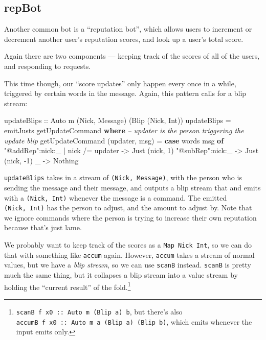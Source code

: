 \documentclass[]{article}
\newenvironment{Shaded}{}{}
\newcommand{\KeywordTok}[1]{\textcolor[rgb]{0.00,0.44,0.13}{\textbf{#1}}}
\newcommand{\DataTypeTok}[1]{\textcolor[rgb]{0.56,0.13,0.00}{#1}}
\newcommand{\DecValTok}[1]{\textcolor[rgb]{0.25,0.63,0.44}{#1}}
\newcommand{\StringTok}[1]{\textcolor[rgb]{0.25,0.44,0.63}{#1}}
\newcommand{\CommentTok}[1]{\textcolor[rgb]{0.38,0.63,0.69}{\textit{#1}}}
\newcommand{\OtherTok}[1]{\textcolor[rgb]{0.00,0.44,0.13}{#1}}
\newcommand{\FunctionTok}[1]{\textcolor[rgb]{0.02,0.16,0.49}{#1}}
\newcommand{\NormalTok}[1]{#1}
\begin{document}
\subsection{repBot}\label{repbot}

Another common bot is a ``reputation bot'', which allows users to increment or
decrement another user's reputation scores, and look up a user's total score.

Again there are two components --- keeping track of the scores of all of the
users, and responding to requests.

This time though, our ``score updates'' only happen every once in a while,
triggered by certain words in the message. Again, this pattern calls for a blip
stream:

\begin{Shaded}
\begin{Highlighting}[]
\OtherTok{updateBlips ::} \DataTypeTok{Auto}\NormalTok{ m (}\DataTypeTok{Nick}\NormalTok{, }\DataTypeTok{Message}\NormalTok{) (}\DataTypeTok{Blip}\NormalTok{ (}\DataTypeTok{Nick}\NormalTok{, }\DataTypeTok{Int}\NormalTok{))}
\NormalTok{updateBlips }\FunctionTok{=}\NormalTok{ emitJusts getUpdateCommand}
  \KeywordTok{where}
    \CommentTok{-- updater is the person triggering the update blip}
\NormalTok{    getUpdateCommand (updater, msg) }\FunctionTok{=}
      \KeywordTok{case}\NormalTok{ words msg }\KeywordTok{of}
        \StringTok{"@addRep"}\FunctionTok{:}\NormalTok{nick}\FunctionTok{:}\NormalTok{_ }\FunctionTok{|}\NormalTok{ nick }\FunctionTok{/=}\NormalTok{ updater }\OtherTok{->} \DataTypeTok{Just}\NormalTok{ (nick, }\DecValTok{1}\NormalTok{)}
        \StringTok{"@subRep"}\FunctionTok{:}\NormalTok{nick}\FunctionTok{:}\NormalTok{_                   }\OtherTok{->} \DataTypeTok{Just}\NormalTok{ (nick, }\FunctionTok{-}\DecValTok{1}\NormalTok{)}
\NormalTok{        _                                  }\OtherTok{->} \DataTypeTok{Nothing}
\end{Highlighting}
\end{Shaded}

\texttt{updateBlips} takes in a stream of \texttt{(Nick,\ Message)}, with the
person who is sending the message and their message, and outputs a blip stream
that and emits with a \texttt{(Nick,\ Int)} whenever the message is a command.
The emitted \texttt{(Nick,\ Int)} has the person to adjust, and the amount to
adjust by. Note that we ignore commands where the person is trying to increase
their own reputation because that's just lame.

We probably want to keep track of the scores as a \texttt{Map\ Nick\ Int}, so we
can do that with something like \texttt{accum} again. However, \texttt{accum}
takes a stream of normal values, but we have a \emph{blip stream}, so we can use
\texttt{scanB} instead. \texttt{scanB} is pretty much the same thing, but it
collapses a blip stream into a value stream by holding the ``current result'' of
the fold.\footnote{\texttt{scanB\ f\ x0\ ::\ Auto\ m\ (Blip\ a)\ b}, but there's
  also \texttt{accumB\ f\ x0\ ::\ Auto\ m\ a\ (Blip\ a)\ (Blip\ b)}, which emits
  whenever the input emits only.}
\end{document}
